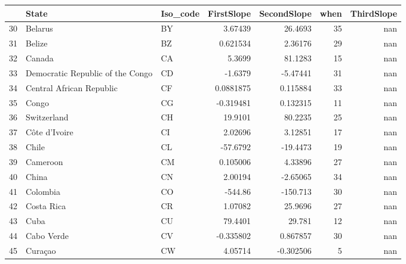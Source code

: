 \begin{tabular}{rllrrrr}
\hline
    & State                            & Iso\_code   &    FirstSlope &   SecondSlope &   when &   ThirdSlope \\
\hline
 30 & Belarus                          & BY         &    3.67439    &    26.4693    &     35 &          nan \\
 31 & Belize                           & BZ         &    0.621534   &     2.36176   &     29 &          nan \\
 32 & Canada                           & CA         &    5.3699     &    81.1283    &     15 &          nan \\
 33 & Democratic Republic of the Congo & CD         &   -1.6379     &    -5.47441   &     31 &          nan \\
 34 & Central African Republic         & CF         &    0.0881875  &     0.115884  &     33 &          nan \\
 35 & Congo                            & CG         &   -0.319481   &     0.132315  &     11 &          nan \\
 36 & Switzerland                      & CH         &   19.9101     &    80.2235    &     25 &          nan \\
 37 & Côte d’Ivoire                    & CI         &    2.02696    &     3.12851   &     17 &          nan \\
 38 & Chile                            & CL         &  -57.6792     &   -19.4473    &     19 &          nan \\
 39 & Cameroon                         & CM         &    0.105006   &     4.33896   &     27 &          nan \\
 40 & China                            & CN         &    2.00194    &    -2.65065   &     34 &          nan \\
 41 & Colombia                         & CO         & -544.86       &  -150.713     &     30 &          nan \\
 42 & Costa Rica                       & CR         &    1.07082    &    25.9696    &     27 &          nan \\
 43 & Cuba                             & CU         &   79.4401     &    29.781     &     12 &          nan \\
 44 & Cabo Verde                       & CV         &   -0.335802   &     0.867857  &     30 &          nan \\
 45 & Curaçao                          & CW         &    4.05714    &    -0.302506  &      5 &          nan \\

\end{tabular}
